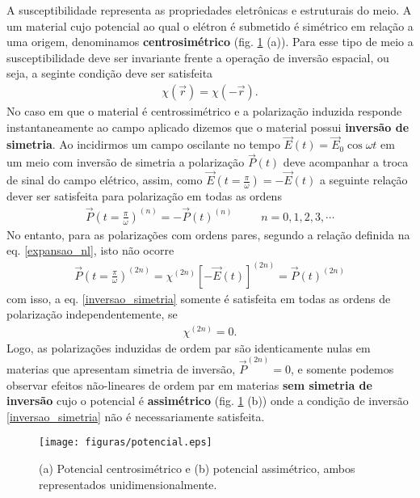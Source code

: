 A susceptibilidade representa as propriedades eletrônicas e estruturais do meio. A um material cujo potencial ao qual o elétron é submetido é simétrico em relação a uma origem, denominamos \textbf{centrosimétrico} (fig. \ref{fig:potencial} (a)). Para esse tipo de meio a susceptibilidade deve ser invariante frente a operação de inversão espacial, ou seja, a seginte condição deve ser satisfeita
\begin{eqnarray}
 \chi(\vec{r}) = \chi(-\vec{r}) .
\label{inversao_chi}
\end{eqnarray}
 No caso em que o material é centrossimétrico e a polarização induzida responde instantaneamente ao campo aplicado dizemos que o material possui \textbf{inversão de simetria}. Ao incidirmos um campo oscilante no tempo $\vec{E}(t)=\vec{E}_0 \cos{\omega t}$ em um meio com inversão de simetria a polarização $\vec{P}(t)$ deve acompanhar a troca de sinal do campo elétrico, assim, como $\vec{E}(t=\frac{\pi}{\omega})=-\vec{E}(t)$ a seguinte relação dever ser satisfeita para polarização em todas as ordens
\begin{eqnarray}
 \vec{P}(t=\frac{\pi}{\omega})^{(n)}=-\vec{P}(t)^{(n)}\,\,\,\,\,\,\,\,\,\,\,\,\,\,\,n=0,1,2,3,\cdots
\label{inversao_simetria}
\end{eqnarray}
No entanto, para as polarizações com ordens pares, segundo a relação definida na eq. \ref{expansao_nl}, isto não ocorre
\begin{eqnarray}
 \vec{P}(t=\frac{\pi}{\omega})^{(2n)}=\chi^{(2n)}[-\vec{E}(t)]^{(2n)}=\vec{P}(t)^{(2n)}
\end{eqnarray}
com isso, a eq. \ref{inversao_simetria} somente é satisfeita em todas as ordens de polarização independentemente, se
\begin{eqnarray}
 \chi^{(2n)} = 0.
\end{eqnarray}
Logo, as polarizações induzidas de ordem par são identicamente nulas em materias que apresentam simetria de inversão, $\vec{P}^{(2n)}=0$, e somente podemos observar efeitos não-lineares de ordem par em materias \textbf{sem simetria de inversão} cujo o potencial é \textbf{assimétrico} (fig. \ref{fig:potencial} (b)) onde a condição de inversão \ref{inversao_simetria} não é necessariamente satisfeita.
\begin{figure}[h]
\centering
\texttt{[image: figuras/potencial.eps]}
\caption{(a) Potencial centrosimétrico e (b) potencial assimétrico, ambos representados unidimensionalmente. \cite{boyd}}
\label{fig:potencial}
\end{figure}

